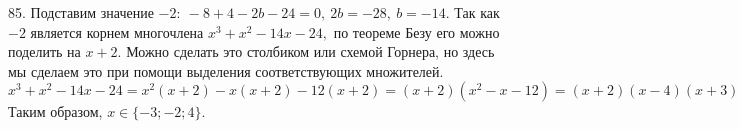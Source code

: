 85. Подставим значение $-2:\ -8+4-2b-24=0,\ 2b=-28,\ b=-14.$ Так как $-2$ является корнем многочлена $x^3+x^2-14x-24,$ по теореме Безу его можно поделить на $x+2.$ Можно сделать это столбиком или схемой Горнера, но здесь мы сделаем это при помощи выделения соответствующих множителей.
$x^3+x^2-14x-24=x^2(x+2)-x(x+2)-12(x+2)=(x+2)(x^2-x-12)=(x+2)(x-4)(x+3).$ Таким образом, $x\in\{-3; -2; 4\}.$\\
